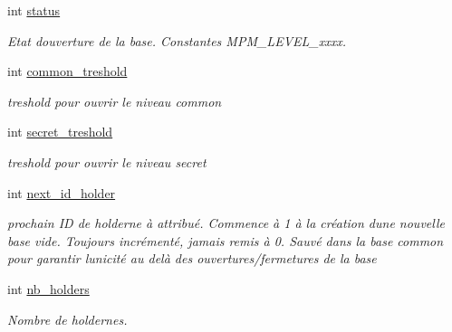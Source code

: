\begin{DoxyCompactItemize}
\mbox{\label{classt__database_a22f93e2118f012a6b4509045438d95c5}} 
int \hyperlink{classt__database_a22f93e2118f012a6b4509045438d95c5}{status}
\begin{DoxyCompactList}\small\item\em Etat d\textquotesingle{}ouverture de la base. Constantes M\+P\+M\+\_\+\+L\+E\+V\+E\+L\+\_\+xxxx. \end{DoxyCompactList}\item 
\mbox{\label{classt__database_a9cc9b76f9ce4d22080b31969ad12c2ba}} 
int \hyperlink{classt__database_a9cc9b76f9ce4d22080b31969ad12c2ba}{common\+\_\+treshold}
\begin{DoxyCompactList}\small\item\em treshold pour ouvrir le niveau common \end{DoxyCompactList}\item 
\mbox{\label{classt__database_a2cf0215c007666523cf17d9cbd3feab7}} 
int \hyperlink{classt__database_a2cf0215c007666523cf17d9cbd3feab7}{secret\+\_\+treshold}
\begin{DoxyCompactList}\small\item\em treshold pour ouvrir le niveau secret \end{DoxyCompactList}\item 
\mbox{\label{classt__database_acd7c4ef13903f2e3690b17b3b475407a}} 
int \hyperlink{classt__database_acd7c4ef13903f2e3690b17b3b475407a}{next\+\_\+id\+\_\+holder}
\begin{DoxyCompactList}\small\item\em prochain ID de holderne à attribué. Commence à 1 à la création d\textquotesingle{}une nouvelle base vide. Toujours incrémenté, jamais remis à 0. Sauvé dans la base common pour garantir l\textquotesingle{}unicité au delà des ouvertures/fermetures de la base \end{DoxyCompactList}\item 
\mbox{\label{classt__database_aff745297de7163dc710c64dc169d107b}} 
int \hyperlink{classt__database_aff745297de7163dc710c64dc169d107b}{nb\+\_\+holders}
\begin{DoxyCompactList}\small\item\em Nombre de holdernes. \end{DoxyCompactList}\item 

\end{DoxyCompactItemize}
